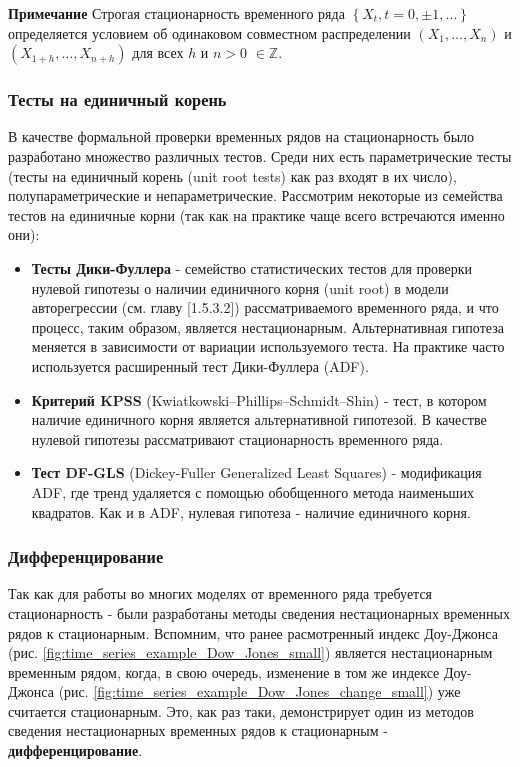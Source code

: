 \noindent\textbf{Примечание} Строгая стационарность временного ряда $\left\{ 
X_t, t = 0, \pm 1, \dots \right\}$ определяется условием об одинаковом 
совместном распределении
$ \left( X_1, \dots, X_n \right) $ и $ \left( X_{1+h}, \dots, X_{n+h} \right) $ 
для всех $h$ и $n > 0$ $\in \mathbb{Z}$.

\subsubsection{Тесты на единичный корень}

В качестве формальной проверки временных рядов на стационарность было 
разработано множество различных тестов. Среди них есть 
параметрические тесты (тесты на единичный корень (unit root tests) как 
раз входят в их число), полупараметрические и непараметрические. 
Рассмотрим некоторые из семейства тестов на единичные корни (так как 
на практике чаще всего встречаются именно они):

\begin{itemize}
    \item \textbf{Тесты Дики-Фуллера} - семейство статистических тестов для проверки 
    нулевой гипотезы о наличии единичного корня (unit root) в модели 
    авторегрессии (см. главу [1.5.3.2]) рассматриваемого временного ряда, и что процесс, 
    таким образом, является нестационарным. Альтернативная гипотеза меняется в зависимости от 
    вариации используемого теста. На практике часто используется расширенный 
    тест Дики-Фуллера (ADF).

    \item \textbf{Критерий KPSS} (Kwiatkowski–Phillips–Schmidt–Shin) - тест, 
    в котором наличие единичного корня является альтернативной гипотезой. 
    В качестве нулевой гипотезы рассматривают стационарность временного ряда.
    
    \item  \textbf{Тест DF-GLS} (Dickey-Fuller Generalized Least Squares) - 
    модификация ADF, где тренд удаляется с помощью 
    обобщенного метода наименьших квадратов. Как и в ADF, 
    нулевая гипотеза - наличие единичного корня.
\end{itemize}

\subsubsection{Дифференцирование}

Так как для работы во многих моделях от временного ряда требуется стационарность - 
были разработаны методы сведения нестационарных временных рядов к стационарным. 
Вспомним, что ранее расмотренный индекс Доу-Джонса (рис. \ref{fig:time_series_example_Dow_Jones_small}) 
является нестационарным временным рядом, когда, в свою очередь, 
изменение в том же индексе Доу-Джонса (рис. \ref{fig:time_series_example_Dow_Jones_change_small}) 
уже считается стационарным. Это, как раз таки, демонстрирует 
один из методов сведения нестационарных временных рядов к стационарным - 
\textbf{дифференцирование}. \\

